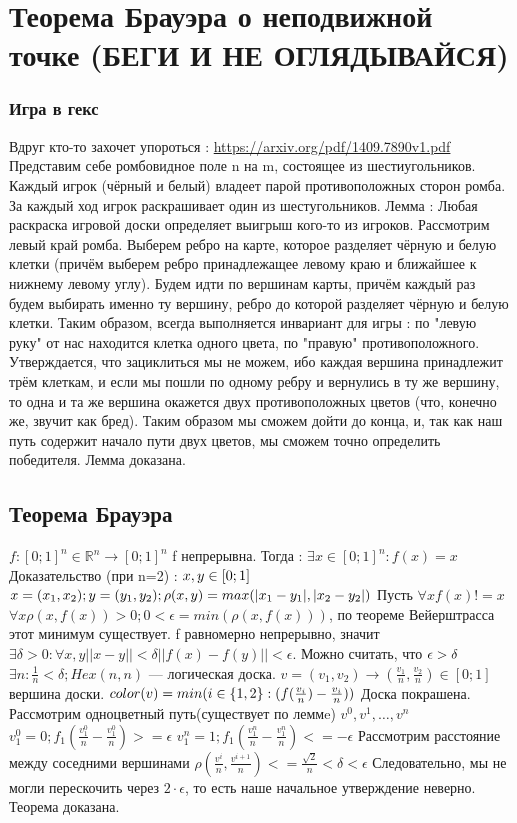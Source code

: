 \documentclass[12pt, a4paper]{article}
\newcommand{\nl}{\newline}
\begin{document}
	\section{Теорема Брауэра о неподвижной точке (БЕГИ И НЕ ОГЛЯДЫВАЙСЯ)}
	\subsubsection{Игра в гекс}
	Вдруг кто-то захочет упороться : \url{https://arxiv.org/pdf/1409.7890v1.pdf} \nl
	Представим себе ромбовидное поле n на m, состоящее из шестиугольников. Каждый игрок (чёрный и белый) владеет парой противоположных сторон ромба. За каждый ход игрок раскрашивает один из шестугольников. \nl
	Лемма : Любая раскраска игровой доски определяет выигрыш кого-то из игроков. \nl
	Рассмотрим левый край ромба. Выберем ребро на карте, которое разделяет чёрную и белую клетки (причём выберем ребро принадлежащее левому краю и ближайшее к нижнему левому углу). Будем идти по вершинам карты, причём каждый раз будем выбирать именно ту вершину, ребро до которой разделяет чёрную и белую клетки. Таким образом, всегда выполняется инвариант для игры : по "левую руку" от нас находится клетка одного цвета, по "правую" противоположного. Утверждается, что зациклиться мы не можем, ибо каждая вершина принадлежит трём клеткам, и если мы пошли по одному ребру и вернулись в ту же вершину, то одна и та же вершина окажется двух противоположных цветов (что, конечно же, звучит как бред). Таким образом мы сможем дойти до конца, и, так как наш путь содержит начало пути двух цветов, мы сможем точно определить победителя. Лемма доказана. \nl
	
	\subsection{Теорема Брауэра}
	$f : [0; 1]^n \in \mathbb{R}^n \rightarrow [0; 1]^n$ \nl
	f непрерывна. \nl
	Тогда : $\exists x \in [0; 1]^n : f(x) = x$ \nl
	Доказательство (при n=2) : \nl
	$x, y \in [0; 1] \nl$
	$x = (x_1, x_2); y = (y_1, y_2); \rho(x,y) = max(|x_1-y_1|, |x_2-y_2|) \nl$
	Пусть $ \forall x f(x) != x$ \nl
	$\forall x \rho(x, f(x))>0 ; 0 < \epsilon = min(\rho(x, f(x)))$, по теореме Вейерштрасса этот минимум существует. \nl
	f равномерно непрерывно, значит $\exists \delta > 0 : \forall x,y ||x-y|| < \delta ||f(x)-f(y)|| < \epsilon$. Можно считать, что $\epsilon > \delta \nl$
	$ \exists n : \frac{1}{n} < \delta; Hex(n , n)$ — логическая доска.
	$v = (v_1, v_2) \rightarrow (\frac{v_1}{n}, \frac{v_2}{n}) \in [0; 1]$ вершина доски. \nl
	$color(v) = min(i \in \{1, 2\} : (f(\frac{v_i}{n})-\frac{v_i}{n})) \nl$ 
	Доска покрашена. \nl
	Рассмотрим одноцветный путь(существует по леммe) $v^0, v^1, \ldots , v^n$ \nl
	$v^0_1 = 0; f_1(\frac{v^0_1}{n}-\frac{v^0_1}{n}) >=\epsilon$ \nl
	$v^n_1 = 1; f_1(\frac{v^n_1}{n}-\frac{v^n_1}{n}) <=-\epsilon$ \nl
	Рассмотрим расстояние между соседними вершинами \nl
	$\rho(\frac{v^i}{n}, \frac{v^{i+1}}{n}) <= \frac{\sqrt{2}}{n} < \delta < \epsilon$ \nl
	Следовательно, мы не могли перескочить через $2 \cdot \epsilon$, то есть наше начальное утверждение неверно. \nl
	Теорема доказана.
	
\end{document}
